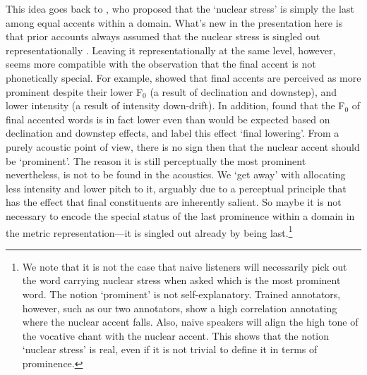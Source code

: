 \documentclass[preprint,review,12pt,authoryear,times]{elsarticle}
\begin{document}
This idea goes back to \citet[][]{newma46}, who proposed that the `nuclear stress' is simply the last among equal accents within a domain. What's new in the presentation here is that prior accounts always assumed that the nuclear stress is singled out representationally \citep[e.g.][]{SPE, truck95}. Leaving it representationally at the same level, however, seems more compatible with the observation that the final accent is not phonetically special. For example, \citet{pierr79} showed that final accents are perceived as more prominent despite their lower F$_0$ (a result of declination and downstep), and lower  intensity (a result of intensity down-drift). In addition, \citet{liber84} found  that the F$_0$ of final accented words is in fact lower even than would be expected based on declination and downstep effects, and label this effect `final lowering'. From a purely acoustic point of view, there is no sign then that the nuclear accent should be  `prominent'. The reason it is still perceptually the most prominent nevertheless, is not to be found in the acoustics. We `get away' with allocating less intensity and lower pitch to it, arguably due to a perceptual principle that has the effect that final constituents are inherently salient. So maybe it is not necessary to encode the special status of the last prominence within a domain in the metric representation---it is singled out already by being last.\footnote{We note that it is not the case that naive listeners will necessarily pick out the word carrying nuclear stress when asked which is the most prominent word. The notion `prominent' is not self-explanatory. Trained annotators, however, such as our two annotators, show a high correlation annotating where the nuclear accent falls. Also, naive speakers will align the high tone of the vocative chant with the nuclear accent. This shows that the notion `nuclear stress' is real, even if it is not trivial to define it in terms of prominence.}   
\end{document}

